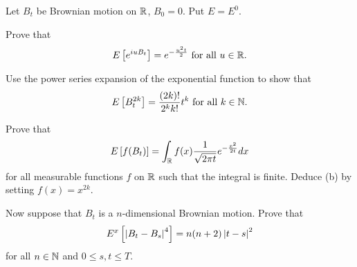 \begin{exercise}{2.8}\label{ex:2.8}
    Let $B_t$ be Brownian motion on $\mathbb{R}$, $B_0 = 0$. Put $E = E^0$. 
    \begin{thmenum}
        \item Prove that 
        \begin{equation*}
            E\left[ {e^{iuB_t}} \right] = e^{-\frac{u^2t}{2}} \text{ for all } u\in\mathbb{R}.
        \end{equation*}
        \item Use the power series expansion of the exponential function to show that
        \begin{equation*}
            E\left[ {B_t^{2k}} \right] = \frac{(2k)!}{2^k k!} t^k \text{ for all } k\in\mathbb{N}.
        \end{equation*}
        \item Prove that 
        \begin{equation*}
            E\left[ {f(B_t)} \right] = \int_{\mathbb{R}} f(x) \frac{1}{\sqrt{2\pi t}} e^{-\frac{x^2}{2t}} dx
        \end{equation*}
        for all measurable functions $f$ on $\mathbb{R}$ such that the integral is finite. Deduce (b) by 
        setting $f(x) = x^{2k}$.
        \item Now suppose that $B_t$ is a $n$-dimensional Brownian motion. Prove that 
        \begin{equation*}
            E^x\left[ {\left\lvert {B_t - B_s} \right\rvert^4} \right] = n(n+2)\left\lvert {t-s} \right\rvert^2
        \end{equation*}
        for all $n\in\mathbb{N}$ and $0\leq s,t\leq T$.
    \end{thmenum}
\end{exercise}
